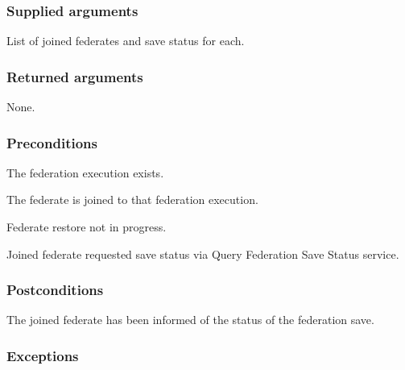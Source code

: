 \subsubsection{Supplied arguments}

\begin{stdalphalist}
    \item List of joined federates and save status for each.
\end{stdalphalist}

\subsubsection{Returned arguments}

\begin{stdalphalist}
    \item None.
\end{stdalphalist}

\subsubsection{Preconditions}

\begin{stdalphalist}
    \item The federation execution exists.
    \item The federate is joined to that federation execution.
    \item Federate restore not in progress.
    \item Joined federate requested save status via Query Federation Save Status service.
\end{stdalphalist}

\subsubsection{Postconditions}

\begin{stdalphalist}
    \item The joined federate has been informed of the status of the federation save.
\end{stdalphalist}

\clearpage


\subsubsection{Exceptions}

